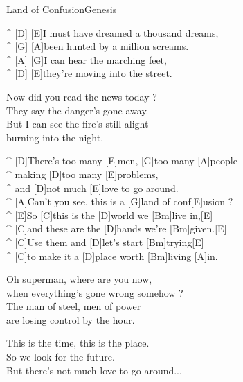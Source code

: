 \begin{song}{Land of Confusion}{Genesis}

\begin{guitar}
^ [D]  [E]I must have dreamed a thousand dreams,\\
^ [G]  [A]been hunted by a million screams.\\
^ [A]  [G]I can hear the marching feet,\\
^ [D]  [E]they're moving into the street.\\
\end{guitar}

\begin{guitar}
Now did you read the news today ?\\
They say the danger's gone away.\\
But I can see the fire's still alight\\
burning into the night.\\
\end{guitar}

\begin{guitar}
^ [D]There's too many [E]men, [G]too many [A]people\\
^ making [D]too many [E]problems,\\
^ and [D]not much [E]love to go around.\\
^ [A]Can't you see, this is a [G]land of conf[E]usion ?\\
^ [E]So [C]this is the [D]world we [Bm]live in,[E]\\
^ [C]and these are the [D]hands we're [Bm]given.[E]\\
^ [C]Use them and [D]let's start [Bm]trying[E]\\
^ [C]to make it a [D]place worth [Bm]living [A]in.\\
\end{guitar}

\begin{guitar}
Oh superman, where are you now,\\
when everything's gone wrong somehow ?\\
The man of steel, men of power\\
are losing control by the hour.\\
\end{guitar}


\begin{guitar}
This is the time, this is the place.\\
So we look for the future.\\
But there's not much love to go around...\\
\end{guitar}


\end{song}
